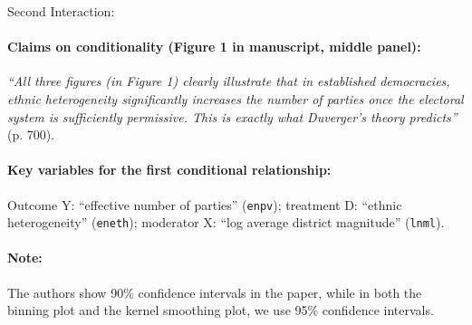\documentclass[12pt]{article}
\begin{document}
\clearpage

\noindent Second Interaction:


\paragraph{Claims on conditionality (Figure 1 in manuscript, middle panel):} \emph{``All three
  figures (in Figure 1) clearly illustrate that in established democracies, ethnic
  heterogeneity significantly increases the number of parties once the
  electoral system is sufficiently permissive. This is exactly what
  Duverger’s theory predicts''} (p. 700).

\paragraph{Key variables for the first conditional relationship:} Outcome Y:
``effective number of parties'' 
(\texttt{enpv}); treatment D:  ``ethnic
heterogeneity'' (\texttt{eneth}); moderator X: ``log average district magnitude'' (\texttt{lnml}). 

\paragraph{Note:} The authors show 90\% confidence intervals in the paper, while in both the binning plot and the kernel smoothing plot, we use 95\% confidence intervals.
\end{document}
